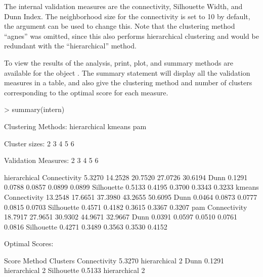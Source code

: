 \documentclass[11pt]{article}
\begin{document}
The internal validation measures are the connectivity, Silhouette Width, and
Dunn Index.   The neighborhood size for the connectivity is
set to 10 by default, the  argument can be used to change
this.  Note that the clustering method ``agnes'' was omitted, since
this also performs hierarchical clustering and would be redundant with
the ``hierarchical'' method.  

\begin{Schunk}
\end{Schunk}

To view the results of the analysis, print, plot, and summary methods
are available for the  object .  The summary
statement will display all the validation measures in a table, and
also give the clustering method and number of clusters corresponding
to the optimal score for each measure.

\begin{Schunk}
\begin{Sinput}
> summary(intern)
\end{Sinput}
\begin{Soutput}
Clustering Methods:
 hierarchical kmeans pam 

Cluster sizes:
 2 3 4 5 6 

Validation Measures:
                                 2       3       4       5       6
                                                                  
hierarchical Connectivity   5.3270 14.2528 20.7520 27.0726 30.6194
             Dunn           0.1291  0.0788  0.0857  0.0899  0.0899
             Silhouette     0.5133  0.4195  0.3700  0.3343  0.3233
kmeans       Connectivity  13.2548 17.6651 37.3980 43.2655 50.6095
             Dunn           0.0464  0.0873  0.0777  0.0815  0.0703
             Silhouette     0.4571  0.4182  0.3615  0.3367  0.3207
pam          Connectivity  18.7917 27.9651 30.9302 44.9671 32.9667
             Dunn           0.0391  0.0597  0.0510  0.0761  0.0816
             Silhouette     0.4271  0.3489  0.3563  0.3530  0.4152

Optimal Scores:

             Score  Method       Clusters
Connectivity 5.3270 hierarchical 2       
Dunn         0.1291 hierarchical 2       
Silhouette   0.5133 hierarchical 2       
\end{Soutput}
\end{Schunk}
\end{document}
